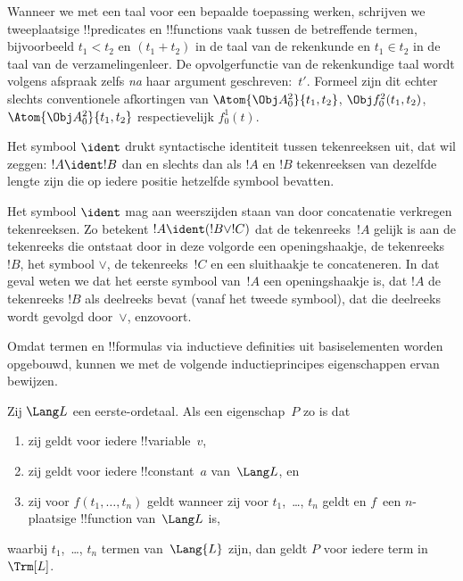 \documentclass[openany]{memoir}
\begin{document}
Wanneer we met een taal voor een bepaalde toepassing werken, schrijven
we tweeplaatsige !!{predicate}s en !!{function}s vaak tussen de
betreffende termen, bijvoorbeeld $t_1 < t_2$ en $(t_1 + t_2)$ in de
taal van de rekenkunde en $t_1 \in t_2$ in de taal van de
verzamelingenleer. De opvolgerfunctie van de rekenkundige taal wordt
volgens afspraak zelfs \emph{na} haar argument geschreven:~$t'$.
Formeel zijn dit echter slechts conventionele afkortingen van
$\Atom{\Obj A^2_0}{t_1, t_2}$, $\Obj f^2_0(t_1, t_2)$,
$\Atom{\Obj A^2_0}{t_1, t_2}$ respectievelijk $f^1_0(t)$.

\begin{defn}
Het symbool $\ident$ drukt syntactische identiteit tussen tekenreeksen
uit, dat wil zeggen: $!A \ident !B$ dan en slechts dan als $!A$ en $!B$
tekenreeksen van dezelfde lengte zijn die op iedere positie hetzelfde
symbool bevatten.
\end{defn}

Het symbool $\ident$ mag aan weerszijden staan van door concatenatie
verkregen tekenreeksen. Zo betekent $!A \ident (!B \lor !C)$ dat de
tekenreeks~$!A$ gelijk is aan de tekenreeks die ontstaat door in deze
volgorde een openingshaakje, de tekenreeks $!B$, het symbool $\lor$, de
tekenreeks~$!C$ en een sluithaakje te concateneren. In dat geval weten
we dat het eerste symbool van~$!A$ een openingshaakje is, dat $!A$ de
tekenreeks $!B$ als deelreeks bevat (vanaf het tweede symbool), dat die
deelreeks wordt gevolgd door~$\lor$, enzovoort.

Omdat termen en !!{formula}s via inductieve definities uit basiselementen
worden opgebouwd, kunnen we met de volgende inductieprincipes
eigenschappen ervan bewijzen.

\begin{lem}
    Zij $\Lang L$ een eerste-ordetaal.
    Als een eigenschap~$P$ zo is dat
    \begin{enumerate}
        \item zij geldt voor iedere !!{variable}~$v$,
        \item zij geldt voor iedere !!{constant}~$a$ van~$\Lang L$, en
        \item zij voor $f(t_1,\dotsc,t_n)$ geldt wanneer zij voor
        $t_1$,~\dots, $t_n$ geldt en $f$~een $n$-plaatsige
            !!{function} van~$\Lang L$ is,
    \end{enumerate}
    waarbij $t_1$,~\dots, $t_n$ termen van~$\Lang{L}$ zijn, dan geldt
    $P$ voor iedere term in~$\Trm[L]$.
\end{lem}
\end{document}
